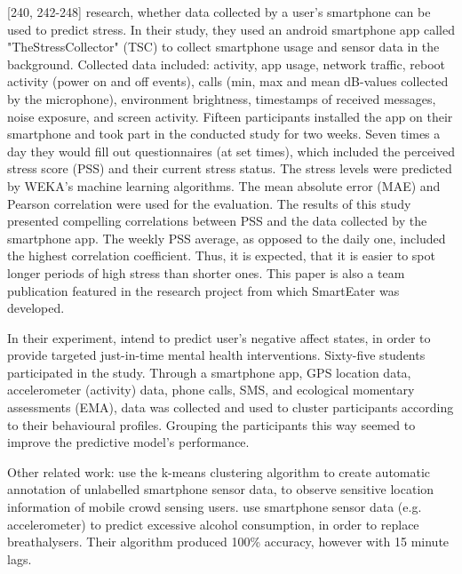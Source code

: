 \textcite{SmartphoneBasedStressPrediction2015}[240, 242-248] research, whether data collected by a user's smartphone can be used to predict stress. In their study, they used an android smartphone app called "TheStressCollector" (TSC) to collect smartphone usage and sensor data in the background. Collected data included: activity, app usage, network traffic, reboot activity (power on and off events), calls (min, max and mean dB-values collected by the microphone), environment brightness, timestamps of received messages, noise exposure, and screen activity. Fifteen participants installed the app on their smartphone and took part in the conducted study for two weeks. Seven times a day they would fill out questionnaires (at set times), which included the perceived stress score (PSS) and their current stress status. The stress levels were predicted by WEKA's machine learning algorithms. The mean absolute error (MAE) and Pearson correlation were used for the evaluation. The results of this study presented compelling correlations between PSS and the data collected by the smartphone app. The weekly PSS average, as opposed to the daily one, included the highest correlation coefficient. Thus, it is expected, that it is easier to spot longer periods of high stress than shorter ones. This paper is also a team publication featured in the research project from which SmartEater was developed.

In their experiment, \textcite{ClusterPassivelySensedData2018} intend to predict user's negative affect states, in order to provide targeted just-in-time mental health interventions. Sixty-five students participated in the study. Through a smartphone app, GPS location data, accelerometer (activity) data, phone calls, SMS, and ecological momentary assessments (EMA), data was collected and used to cluster participants according to their behavioural profiles. Grouping the participants this way seemed to improve the predictive model's performance.


Other related work: 
\textcite{pius2018automatic} use the k-means clustering algorithm to create automatic annotation of unlabelled smartphone sensor data, to observe sensitive location information of mobile crowd sensing users. \textcite{alcoholCravingPrediction} use smartphone sensor data (e.g. accelerometer) to predict excessive alcohol consumption, in order to replace breathalysers. Their algorithm produced 100\% accuracy, however with 15 minute lags.
